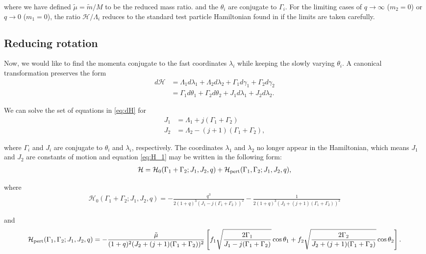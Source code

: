 \documentclass[usenatbib,twocolumn]{mnras}
\begin{document}
\noindent where we have defined \(\tilde\mu=\tilde m/M\) to be
the reduced mass ratio.  and the \(\theta_i\) are conjugate to
\(\Gamma_i\).  For the limiting cases of \(q\to \infty\) (\(m_2=0\)) or
\(q\to 0\) (\(m_1=0\)), the ratio \(\mathcal{H}/\Lambda_i\) reduces to the
standard test particle Hamiltonian found in \citet{murray_solar_2000} if
the limits are taken carefully.
\subsection{Reducing rotation}
\label{sec:orgefc4161}
Now, we would like to find the momenta conjugate to the fast
coordinates \(\lambda_i\) while keeping the slowly varying \(\theta_i\).
A canonical transformation preserves the form
\begin{align}
  \label{eq:dH} 
  d\mathcal{H}
  &= \Lambda_1 d\lambda_1+\Lambda_2d\lambda_2
    + \Gamma_1d\gamma_1+\Gamma_2d\gamma_2\nonumber\\
  &= \Gamma_1 d\theta_1 + \Gamma_2 d\theta_2
    +J_1 d\lambda_1+J_2d\lambda_2 .
\end{align}

\noindent
We can solve the set of equations in \eqref{eq:dH} for
\begin{align}
\label{eq:J1}
J_1 &= \Lambda_1 + j(\Gamma_1+\Gamma_2)\\
\label{eq:J2}
J_2 &= \Lambda_2 - (j+1)(\Gamma_1+\Gamma_2),
\end{align}

\noindent where \(\Gamma_i\) and \(J_i\) are conjugate to
\(\theta_i\) and \(\lambda_i\), respectively.
The coordinates \(\lambda_1\) and \(\lambda_2\)
no longer appear in the Hamiltonian,
which means \(J_1\) and \(J_2\) are constants of motion and
equation \eqref{eq:H_1} may be written
in the following form:
\begin{align}
\label{eq:H_2}
  \mathcal{H}
  = \mathcal{H}_0(\Gamma_1+\Gamma_2; J_1, J_2, q)
                  + \mathcal{H}_{\rm pert}(\Gamma_1,\Gamma_2; J_1, J_2, q),
\end{align}

\noindent
where
\begin{align}
  \label{eq:H01}
  \mathcal{H}_0(\Gamma_1+\Gamma_2; J_1, J_2, q)
  = -\frac{q^3}{2(1+q)^3(J_1-j(\Gamma_1+\Gamma_2))^2}
  -\frac{1}{2(1+q)^3(J_2+(j+1)(\Gamma_1+\Gamma_2))^2} 
\end{align}

\noindent
and
\begin{align}
  \label{eq:Hpert1}
  \mathcal{H}_{\rm pert}(\Gamma_1,\Gamma_2; J_1, J_2, q)
  = -\frac{\tilde\mu}{(1+q)^2(J_2+(j+1)(\Gamma_1+\Gamma_2))^2}
  \left[
    f_1\sqrt{\frac{2\Gamma_1}{J_1 - j(\Gamma_1+\Gamma_2)}}\cos\theta_1
  +f_2\sqrt{\frac{2\Gamma_2}{J_2 + (j+1)(\Gamma_1+\Gamma_2)}}\cos\theta_2
    \right].
\end{align}
\end{document}
